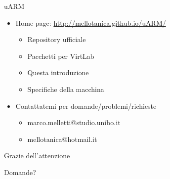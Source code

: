 \documentclass{beamer}
\begin{document}
\begin{frame}{uARM}
\begin{itemize}\itemsep25pt
\item Home page: \url{http://mellotanica.github.io/uARM/}

	\begin{itemize}\itemsep5pt
	\item Repository ufficiale
	\item Pacchetti per VirtLab
	\item Questa introduzione
	\item Specifiche della macchina
	\end{itemize}
	
\item Contattatemi per domande/problemi/richieste

	\begin{itemize}\itemsep4pt
	\item marco.melletti@studio.unibo.it
	\item mellotanica@hotmail.it
	\end{itemize}
\end{itemize}
\end{frame}

\begin{frame}{Grazie dell'attenzione}
\begin{center}\huge 
Domande?
\end{center}
\end{frame}
\end{document}
